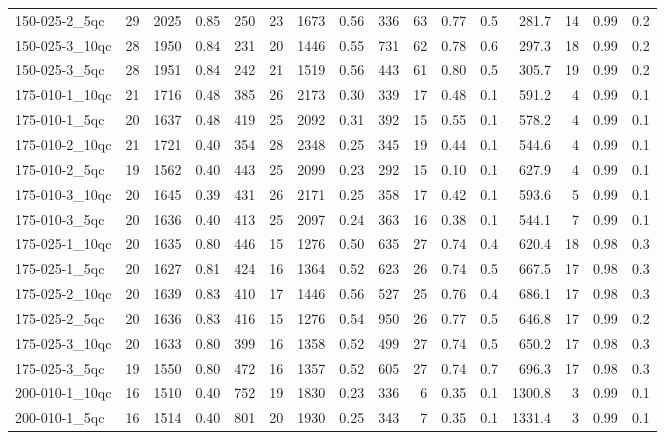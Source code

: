 \documentclass[twoside]{article}
\begin{document}
\begin{longtable}{l|rrrr|rrrr|rrr|rrrr}
		150-025-2\_5qc & 29 & 2025 & 0.85 & 250 & 23 & 1673 & 0.56 & 336 & 63 & 0.77 & 0.5 & 281.7 & 14 & 0.99 & 0.2 \\
		150-025-3\_10qc & 28 & 1950 & 0.84 & 231 & 20 & 1446 & 0.55 & 731 & 62 & 0.78 & 0.6 & 297.3 & 18 & 0.99 & 0.2 \\
		150-025-3\_5qc & 28 & 1951 & 0.84 & 242 & 21 & 1519 & 0.56 & 443 & 61 & 0.80 & 0.5 & 305.7 & 19 & 0.99 & 0.2 \\
		175-010-1\_10qc & 21 & 1716 & 0.48 & 385 & 26 & 2173 & 0.30 & 339 & 17 & 0.48 & 0.1 & 591.2 & 4 & 0.99 & 0.1 \\
		175-010-1\_5qc & 20 & 1637 & 0.48 & 419 & 25 & 2092 & 0.31 & 392 & 15 & 0.55 & 0.1 & 578.2 & 4 & 0.99 & 0.1 \\
		175-010-2\_10qc & 21 & 1721 & 0.40 & 354 & 28 & 2348 & 0.25 & 345 & 19 & 0.44 & 0.1 & 544.6 & 4 & 0.99 & 0.1 \\
		175-010-2\_5qc & 19 & 1562 & 0.40 & 443 & 25 & 2099 & 0.23 & 292 & 15 & 0.10 & 0.1 & 627.9 & 4 & 0.99 & 0.1 \\
		175-010-3\_10qc & 20 & 1645 & 0.39 & 431 & 26 & 2171 & 0.25 & 358 & 17 & 0.42 & 0.1 & 593.6 & 5 & 0.99 & 0.1 \\
		175-010-3\_5qc & 20 & 1636 & 0.40 & 413 & 25 & 2097 & 0.24 & 363 & 16 & 0.38 & 0.1 & 544.1 & 7 & 0.99 & 0.1 \\
		175-025-1\_10qc & 20 & 1635 & 0.80 & 446 & 15 & 1276 & 0.50 & 635 & 27 & 0.74 & 0.4 & 620.4 & 18 & 0.98 & 0.3 \\
		175-025-1\_5qc & 20 & 1627 & 0.81 & 424 & 16 & 1364 & 0.52 & 623 & 26 & 0.74 & 0.5 & 667.5 & 17 & 0.98 & 0.3 \\
		175-025-2\_10qc & 20 & 1639 & 0.83 & 410 & 17 & 1446 & 0.56 & 527 & 25 & 0.76 & 0.4 & 686.1 & 17 & 0.98 & 0.3 \\
		175-025-2\_5qc & 20 & 1636 & 0.83 & 416 & 15 & 1276 & 0.54 & 950 & 26 & 0.77 & 0.5 & 646.8 & 17 & 0.99 & 0.2 \\
		175-025-3\_10qc & 20 & 1633 & 0.80 & 399 & 16 & 1358 & 0.52 & 499 & 27 & 0.74 & 0.5 & 650.2 & 17 & 0.98 & 0.3 \\
		175-025-3\_5qc & 19 & 1550 & 0.80 & 472 & 16 & 1357 & 0.52 & 605 & 27 & 0.74 & 0.7 & 696.3 & 17 & 0.98 & 0.3 \\
		200-010-1\_10qc & 16 & 1510 & 0.40 & 752 & 19 & 1830 & 0.23 & 336 & 6 & 0.35 & 0.1 & 1300.8 & 3 & 0.99 & 0.1 \\
		200-010-1\_5qc & 16 & 1514 & 0.40 & 801 & 20 & 1930 & 0.25 & 343 & 7 & 0.35 & 0.1 & 1331.4 & 3 & 0.99 & 0.1 \\

\end{longtable}
\end{document}
